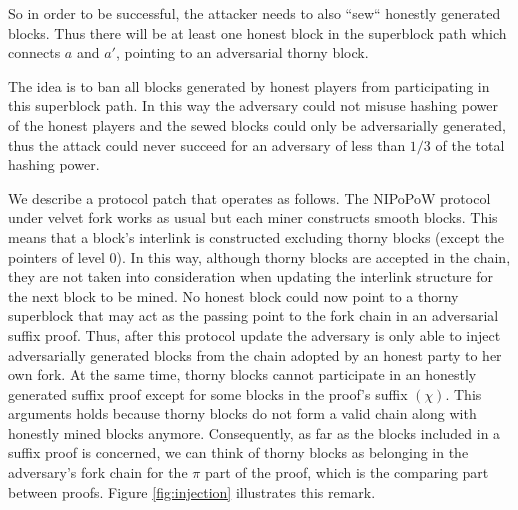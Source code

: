 So in order to be successful, the attacker needs to also ``sew`` honestly generated
blocks. Thus there will be at least one honest block in the superblock path which
connects $a$ and $a'$, pointing to an adversarial thorny block.

The idea is to ban all blocks generated by honest players from participating in
this superblock path. In this way the adversary could not misuse hashing power of
the honest players and the sewed blocks could only be adversarially generated,
thus the attack could never succeed for an adversary of less than $1/3$ of the
total hashing power.

We describe a protocol patch that operates as follows. The NIPoPoW protocol under
velvet fork works as usual but each miner constructs smooth blocks. This means
that  a block's interlink is constructed excluding thorny blocks (except the
pointers of level 0). In this way, although thorny blocks are accepted in the
chain, they are not taken into consideration when updating the interlink structure
for the next block to be mined. No honest block could now point to a thorny superblock
that may act as the passing point to the fork chain in an adversarial suffix proof.
Thus, after this protocol update the adversary is only able to inject adversarially
generated blocks from the chain adopted by an honest party to her own fork.
At the same time, thorny blocks cannot participate in an honestly
generated suffix proof except for some blocks in the proof's suffix $(\chi)$.
This arguments holds because thorny blocks do not form a valid chain along with
honestly mined blocks anymore. Consequently, as far as the blocks included in a
suffix proof is concerned, we can think of thorny blocks as belonging in the
adversary's fork chain for the $\pi$ part of the proof,  which is the comparing
part between proofs. Figure \ref{fig:injection} illustrates this remark.\\

